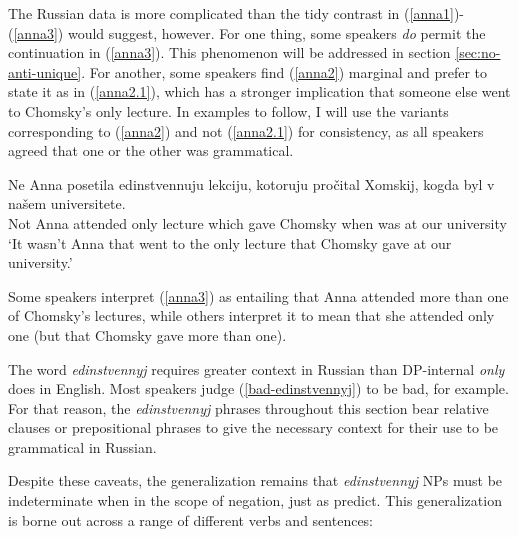 The Russian data is more complicated than the tidy contrast in (\ref{anna1})-(\ref{anna3}) would suggest, however. For one thing, some speakers \textit{do} permit the continuation in (\ref{anna3}). This phenomenon will be addressed in section \ref{sec:no-anti-unique}. For another, some speakers find (\ref{anna2}) marginal and prefer to state it as in (\ref{anna2.1}), which has a stronger implication that someone else went to Chomsky's only lecture. In examples to follow, I will use the variants corresponding to (\ref{anna2}) and not (\ref{anna2.1}) for consistency, as all speakers agreed that one or the other was grammatical.

\begin{exe}
	\ex \label{anna2.1} \gll Ne Anna posetila edinstvennuju lekciju, kotoruju pro\v{c}ital Xomskij, kogda byl v na\v{s}em universitete.\\
	Not Anna attended only lecture which gave Chomsky when was at our university\\
	\glt `It wasn't Anna that went to the only lecture that Chomsky gave at our university.'
\end{exe}

Some speakers interpret (\ref{anna3}) as entailing that Anna attended more than one of Chomsky's lectures, while others interpret it to mean that she attended only one (but that Chomsky gave more than one).

The word \textit{edinstvennyj} requires greater context in Russian than DP-internal \textit{only} does in English. Most speakers judge (\ref{bad-edinstvennyj}) to be bad, for example. For that reason, the \textit{edinstvennyj} phrases throughout this section bear relative clauses or prepositional phrases to give the necessary context for their use to be grammatical in Russian.

\begin{exe}
\end{exe}

Despite these caveats, the generalization remains that \textit{edinstvennyj} NPs must be indeterminate when in the scope of negation, just as \citeauthor{cb2015} predict. This generalization is borne out across a range of different verbs and sentences:

